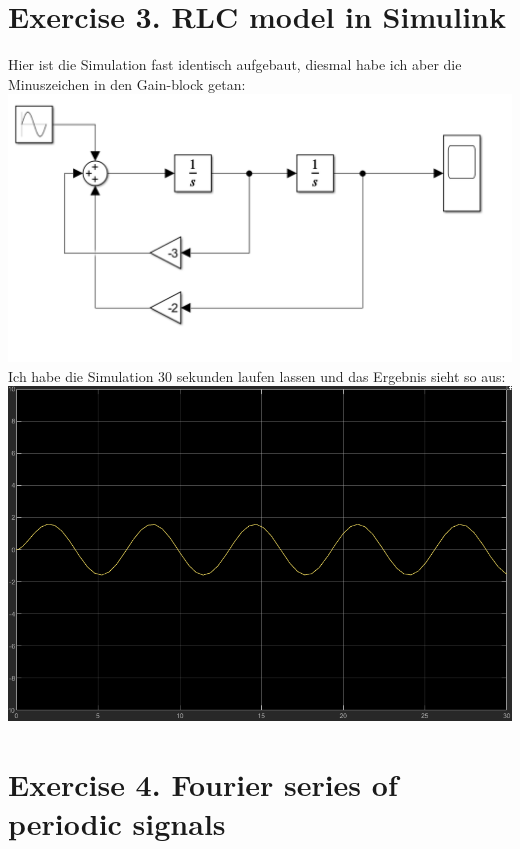 \documentclass{scrartcl}
\begin{document}
\section*{Exercise 3. RLC model in Simulink}
Hier ist die Simulation fast identisch aufgebaut, diesmal habe ich aber die Minuszeichen in den Gain-block getan:\\
\includegraphics[scale=0.4]{RLC_model.png} \\
Ich habe die Simulation 30 sekunden laufen lassen und das Ergebnis sieht so aus:\\
\includegraphics[scale=0.4]{RLC_out.png} \\


\section*{Exercise 4. Fourier series of periodic signals}
\end{document}
